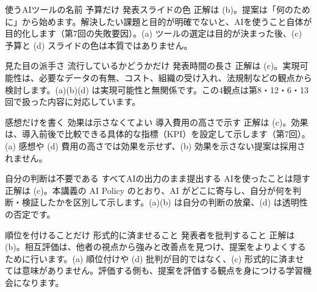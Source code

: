 
%
  {使うAIツールの名前}%
  {}%
  {予算だけ}%
  {発表スライドの色}%
  {正解は (b)。提案は「何のために」から始めます。解決したい課題と目的が明確でないと、AIを使うこと自体が目的化します（第7回の失敗要因）。(a) ツールの選定は目的が決まった後、(c) 予算と (d) スライドの色は本質ではありません。}

%
  {見た目の派手さ}%
  {流行しているかどうかだけ}%
  {}%
  {発表時間の長さ}%
  {正解は (c)。実現可能性は、必要なデータの有無、コスト、組織の受け入れ、法規制などの観点から検討します。(a)(b)(d) は実現可能性と無関係です。この4観点は第8・12・6・13回で扱った内容に対応しています。}

%
  {感想だけを書く}%
  {効果は示さなくてよい}%
  {}%
  {導入費用の高さで示す}%
  {正解は (c)。効果は、導入前後で比較できる具体的な指標（KPI）を設定して示します（第7回）。(a) 感想や (d) 費用の高さでは効果を示せず、(b) 効果を示さない提案は採用されません。}

%
  {自分の判断は不要である}%
  {すべてAIの出力のまま提出する}%
  {}%
  {AIを使ったことは隠す}%
  {正解は (c)。本講義の AI Policy のとおり、AI がどこに寄与し、自分が何を判断・検証したかを区別して示します。(a)(b) は自分の判断の放棄、(d) は透明性の否定です。}

%
  {順位を付けることだけ}%
  {}%
  {形式的に済ませること}%
  {発表者を批判すること}%
  {正解は (b)。相互評価は、他者の視点から強みと改善点を見つけ、提案をよりよくするために行います。(a) 順位付けや (d) 批判が目的ではなく、(c) 形式的に済ませては意味がありません。評価する側も、提案を評価する観点を身につける学習機会になります。}
